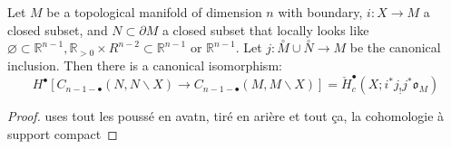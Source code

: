 \begin{lemma}\label{lem:poincare-lefschetz_duality}
    Let $M$ be a topological manifold of dimension $n$ with boundary, $i:X\to M$ a closed subset, and $N\subset \partial M$ a closed subset that locally looks like $\varnothing\subset \mathbb{R}^{n-1}, \mathbb{R}_{>0}\times R^{n-2}\subset \mathbb{R}^{n-1}$ or $\mathbb{R}^{n-1}$. Let $j:\overset{\circ}{M}\cup \overset{\circ}{N}\to M$ be the canonical inclusion. Then there is a canonical isomorphism:
        \[ H^{\bullet}[C_{n-1-\bullet}(N,N\backslash X)\to C_{n-1-\bullet}(M,M\backslash X)]=\check{H}_c^{\bullet}(X;i^*j_!j^*\mathfrak{o}_M)\]


\end{lemma}

\begin{proof}
    uses tout les poussé en avatn, tiré en arière et tout ça, la cohomologie à support compact 
\end{proof}